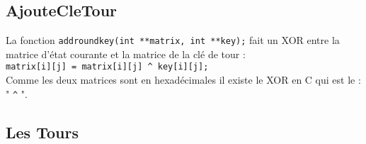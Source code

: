 \documentclass[french, 12pt]{article}
\begin{document}
	\subsection*{AjouteCleTour}
	
	La fonction \verb|addroundkey(int **matrix, int **key);| fait un XOR entre la matrice d'état courante et la matrice de la clé de tour : \\
	 \verb|matrix[i][j] = matrix[i][j] ^ key[i][j];| \\
	 Comme les deux matrices sont en hexadécimales il existe le XOR en C qui est le : " \verb|^| ". 
	
	\subsection*{Les Tours}
\end{document}
